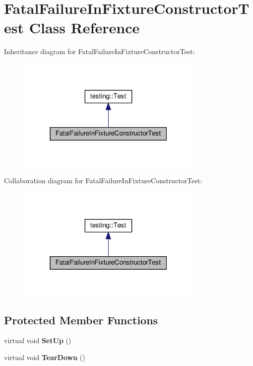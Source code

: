 \hypertarget{class_fatal_failure_in_fixture_constructor_test}{}\section{Fatal\+Failure\+In\+Fixture\+Constructor\+Test Class Reference}
\label{class_fatal_failure_in_fixture_constructor_test}


Inheritance diagram for Fatal\+Failure\+In\+Fixture\+Constructor\+Test\+:
\nopagebreak
\begin{figure}[H]
\begin{center}
\leavevmode
\includegraphics[width=256pt]{class_fatal_failure_in_fixture_constructor_test__inherit__graph}
\end{center}
\end{figure}


Collaboration diagram for Fatal\+Failure\+In\+Fixture\+Constructor\+Test\+:
\nopagebreak
\begin{figure}[H]
\begin{center}
\leavevmode
\includegraphics[width=256pt]{class_fatal_failure_in_fixture_constructor_test__coll__graph}
\end{center}
\end{figure}
\subsection*{Protected Member Functions}
\begin{DoxyCompactItemize}
\item 
\mbox{\label{class_fatal_failure_in_fixture_constructor_test_a006d3ac0e7a4ad3c469c3b41dc7c42c3}} 
virtual void {\bfseries Set\+Up} ()
\item 
\mbox{\label{class_fatal_failure_in_fixture_constructor_test_a2763026a557e1fce4e59bd16c4eced57}} 
virtual void {\bfseries Tear\+Down} ()
\end{DoxyCompactItemize}
